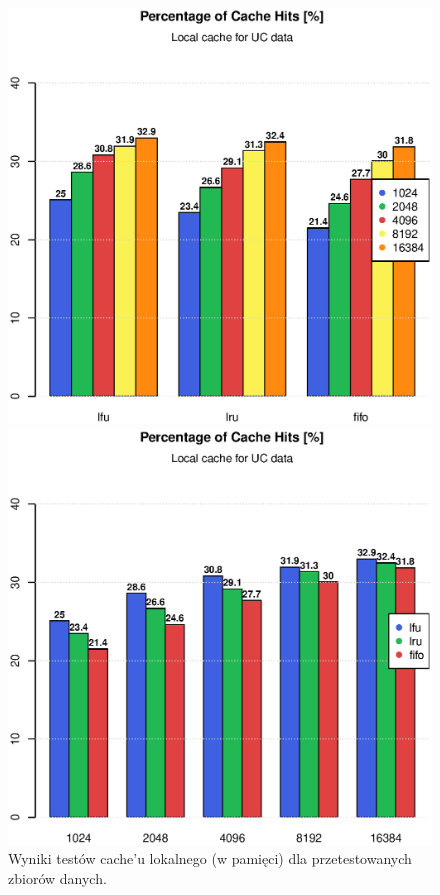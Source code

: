 \documentclass[a4paper,11pt]{scrartcl}
\newcommand{\s}{ }
\newcommand{\keszu}{cache'u}
\begin{document}
\begin{figure}[h!]
\begin{minipage}{0.48\linewidth}
\centering
\includegraphics[width=0.9\linewidth]{img/tests/nop2p_uc_1.eps}
\end{minipage}
\begin{minipage}{0.48\linewidth}
\centering
\includegraphics[width=0.9\linewidth]{img/tests/nop2p_uc_2.eps}
\end{minipage}
\caption{Wyniki testów \keszu\s lokalnego (w pamięci) dla przetestowanych zbiorów danych.}
\label{fig_tests_mem_all}
\end{figure}
\end{document}
